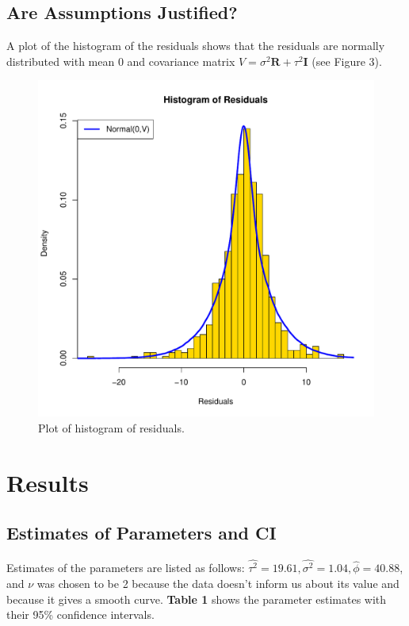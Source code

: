 \documentclass{article}                                                   %
\def\beginmyfig{\begin{figure}[htbp]\begin{center}}                       %
\def\endmyfig{\end{center}\end{figure}}                                   %
\begin{document}
  \subsection{Are Assumptions Justified?}
    A plot of the histogram of the residuals shows that the residuals are normally
    distributed with mean 0 and covariance matrix $V = \sigma^2\bm R + \tau^2\bm I$
    (see Figure 3).
    \beginmyfig
      \includegraphics{raw/hist.pdf}
      \caption{Plot of histogram of residuals.}
    \endmyfig

\section{Results}
  \subsection{Estimates of Parameters and CI}
    Estimates of the parameters are listed as follows: 
    $ \hat{\tau^2} = 19.61, \hat{\sigma^2} = 1.04, \hat{\phi} = 40.88 $, and 
    $\nu$ was chosen to be 2 because the data doesn't inform us about its value
    and because it gives a smooth curve. \textbf{Table 1} shows the 
    parameter estimates with their 95\% confidence intervals.
\end{document}
